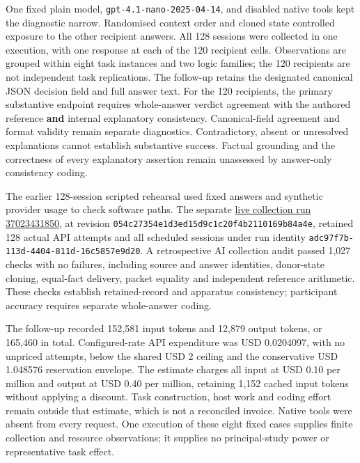 \documentclass[preprint,11pt]{elsarticle}
\begin{document}
One fixed plain model, \nolinkurl{gpt-4.1-nano-2025-04-14}, and disabled
native tools kept the diagnostic narrow. Randomised context order and
cloned state controlled exposure to the other recipient answers. All 128
sessions were collected in one execution, with one response at each of
the 120 recipient cells. Observations are grouped within eight task
instances and two logic families; the 120 recipients are not independent
task replications. The follow-up retains the designated canonical JSON
decision field and full answer text. For the 120 recipients, the primary
substantive endpoint requires whole-answer verdict agreement with the
authored reference \textbf{and} internal explanatory consistency.
Canonical-field agreement and format validity remain separate
diagnostics. Contradictory, absent or unresolved explanations cannot
establish substantive success. Factual grounding and the correctness of
every explanatory assertion remain unassessed by answer-only consistency
coding.

The earlier 128-session scripted rehearsal used fixed answers and
synthetic provider usage to check software paths. The separate
\href{https://github.com/emmett08/earl/actions/runs/37023431850}{live
collection run 37023431850}, at revision
\texttt{054c27354e1d3ed15d9c1c20f4b2110169b84a4e}, retained 128 actual
API attempts and all scheduled sessions under run identity
\texttt{adc97f7b-113d-4404-811d-16c5857e9d20}. A retrospective AI
collection audit passed 1,027 checks with no failures, including source
and answer identities, donor-state cloning, equal-fact delivery, packet
equality and independent reference arithmetic. These checks establish
retained-record and apparatus consistency; participant accuracy requires
separate whole-answer coding.

The follow-up recorded 152,581 input tokens and 12,879 output tokens, or
165,460 in total. Configured-rate API expenditure was USD 0.0204097,
with no unpriced attempts, below the shared USD 2 ceiling and the
conservative USD 1.048576 reservation envelope. The estimate charges all
input at USD 0.10 per million and output at USD 0.40 per million,
retaining 1,152 cached input tokens without applying a discount. Task
construction, host work and coding effort remain outside that estimate,
which is not a reconciled invoice. Native tools were absent from every
request. One execution of these eight fixed cases supplies finite
collection and resource observations; it supplies no principal-study
power or representative task effect.
\end{document}
